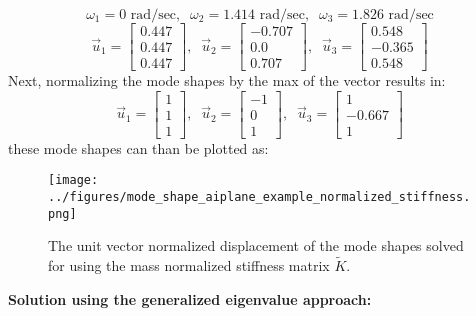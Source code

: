 \documentclass[12pt,letter]{article}
\begin{document}
\begin{example}
	\begin{equation}
	\omega_1 = 0  \text{ rad/sec}, \; \; \omega_2 = 1.414 \text{ rad/sec}, \; \; \omega_3 = 1.826  \text{ rad/sec}
	\end{equation}
	\begin{equation}
	\vec{u}_1 = \begin{bmatrix} 0.447 \\   0.447 \\    0.447 \end{bmatrix}, \; \; \vec{u}_2 = \begin{bmatrix} -0.707 \\    0.0 \\    0.707 \end{bmatrix}, \; \; \vec{u}_3 = \begin{bmatrix} 0.548 \\    -0.365 \\    0.548  \end{bmatrix}
	\end{equation}
	Next, normalizing the mode shapes by the max of the vector results in:
	\begin{equation}
	\vec{u}_1 = \begin{bmatrix} 1 \\    1 \\    1  \end{bmatrix}, \; \; \vec{u}_2 = \begin{bmatrix} -1 \\    0 \\    1 \end{bmatrix}, \; \; \vec{u}_3 = \begin{bmatrix} 1 \\    -0.667 \\    1  \end{bmatrix}
	\end{equation}
	these mode shapes can than be plotted as:
	\begin{figure}[H]
		\centering
		\texttt{[image: ../figures/mode\_shape\_aiplane\_example\_normalized\_stiffness.png]}
		\caption{The unit vector normalized displacement of the mode shapes solved for using the mass normalized stiffness matrix $\tilde{K}$.}
		\label{fig:mode_shape_aiplane_example_normalized_stiffness}
	\end{figure}
	
	\noindent \textbf{Solution using the generalized eigenvalue approach:}


\end{example}
\end{document}

